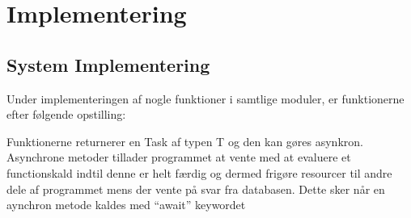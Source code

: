 \section{Implementering}
\subsection{System Implementering}
Under implementeringen af nogle funktioner i samtlige moduler, er funktionerne efter følgende opstilling:\\


Funktionerne returnerer en Task af typen T og den kan gøres asynkron. Asynchrone metoder tillader programmet
at vente med at evaluere et functionskald indtil denne er helt færdig og dermed frigøre resourcer til andre
dele af programmet mens der vente på svar fra databasen.
Dette sker når en aynchron metode kaldes med ``await'' keywordet \\






